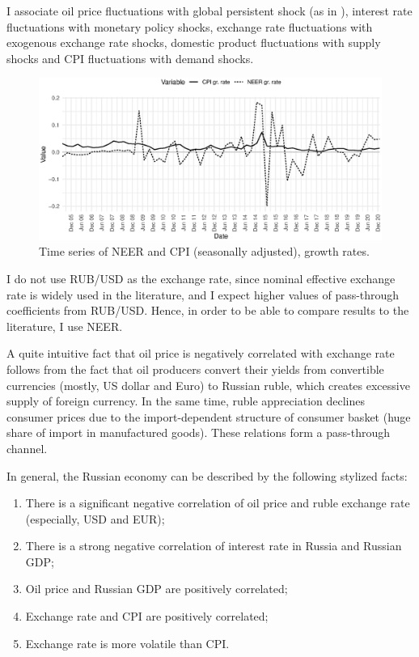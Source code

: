 \documentclass[12pt, a4paper]{extarticle}
\begin{document}
I associate oil price fluctuations with global persistent shock (as in \cite{Forbes2018}), interest rate fluctuations with monetary policy shocks, exchange rate fluctuations with exogenous exchange rate shocks, domestic product fluctuations with supply shocks and CPI fluctuations with demand shocks.
\begin{figure}[b!]
	\centering
	\includegraphics[width=\linewidth]{figures/neer_cpi}
	\caption[]{Time series of NEER and CPI (seasonally adjusted), growth rates.}
	\label{fig:neer_cpi}
\end{figure}

I do not use RUB/USD as the exchange rate, since nominal effective exchange rate is widely used in the literature, and I expect higher values of pass-through coefficients from RUB/USD. Hence, in order to be able to compare results to the literature, I use NEER. 

A quite intuitive fact that oil price is negatively correlated with exchange rate follows from the fact that oil producers convert their yields from convertible currencies (mostly, US dollar and Euro) to Russian ruble, which creates excessive supply of foreign currency. In the same time, ruble appreciation declines consumer prices due to the import-dependent structure of consumer basket (huge share of import in manufactured goods). These relations form a pass-through channel. 

In general, the Russian economy can be described by the following stylized facts:
\begin{enumerate}
	\setlength\itemsep{0.02em}
	\item There is a significant negative correlation of oil price and ruble exchange rate (especially, USD and EUR);
	\item There is a strong negative correlation of interest rate in Russia and Russian GDP;
	\item Oil price and Russian GDP are positively correlated;
	\item Exchange rate and CPI are positively correlated;
	\item Exchange rate is more volatile than CPI.
\end{enumerate}
\end{document}
